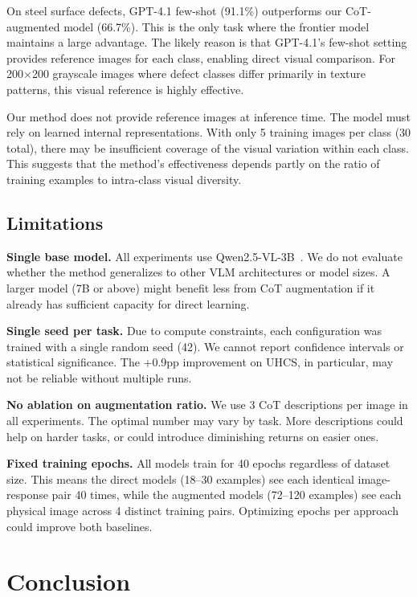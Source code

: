 \documentclass{bmvc2k}
\begin{document}
On steel surface defects, GPT-4.1 few-shot (91.1\%) outperforms our CoT-augmented model (66.7\%). This is the only task where the frontier model maintains a large advantage. The likely reason is that GPT-4.1's few-shot setting provides reference images for each class, enabling direct visual comparison. For 200$\times$200 grayscale images where defect classes differ primarily in texture patterns, this visual reference is highly effective.

Our method does not provide reference images at inference time. The model must rely on learned internal representations. With only 5 training images per class (30 total), there may be insufficient coverage of the visual variation within each class. This suggests that the method's effectiveness depends partly on the ratio of training examples to intra-class visual diversity.

\subsection{Limitations}

\noindent\textbf{Single base model.} All experiments use Qwen2.5-VL-3B~\cite{wang2024qwen2vl}. We do not evaluate whether the method generalizes to other VLM architectures or model sizes. A larger model (7B or above) might benefit less from CoT augmentation if it already has sufficient capacity for direct learning.

\noindent\textbf{Single seed per task.} Due to compute constraints, each configuration was trained with a single random seed (42). We cannot report confidence intervals or statistical significance. The +0.9pp improvement on UHCS, in particular, may not be reliable without multiple runs.

\noindent\textbf{No ablation on augmentation ratio.} We use 3 CoT descriptions per image in all experiments. The optimal number may vary by task. More descriptions could help on harder tasks, or could introduce diminishing returns on easier ones.

\noindent\textbf{Fixed training epochs.} All models train for 40 epochs regardless of dataset size. This means the direct models (18--30 examples) see each identical image-response pair 40 times, while the augmented models (72--120 examples) see each physical image across 4 distinct training pairs. Optimizing epochs per approach could improve both baselines.

\section{Conclusion}
\label{sec:conclusion}
\end{document}
